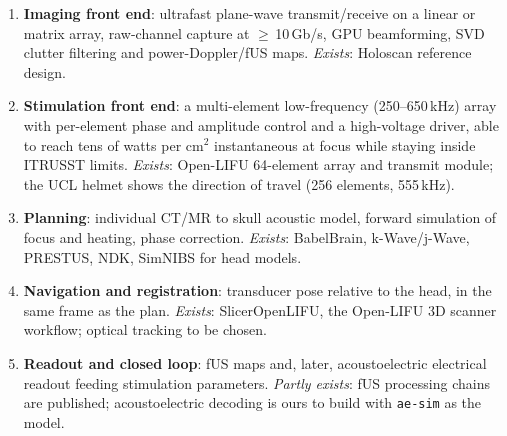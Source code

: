 \documentclass[11pt,a4paper]{article}
\begin{document}
\begin{enumerate}[leftmargin=*]
\item \textbf{Imaging front end}: ultrafast plane-wave transmit/receive on a linear or matrix array, raw-channel capture at $\geq$\,10\,Gb/s, GPU beamforming, SVD clutter filtering and power-Doppler/fUS maps. \emph{Exists}: Holoscan reference design.
\item \textbf{Stimulation front end}: a multi-element low-frequency (250--650\,kHz) array with per-element phase and amplitude control and a high-voltage driver, able to reach tens of watts per cm$^2$ instantaneous at focus while staying inside ITRUSST limits. \emph{Exists}: Open-LIFU 64-element array and transmit module; the UCL helmet shows the direction of travel (256 elements, 555\,kHz).
\item \textbf{Planning}: individual CT/MR to skull acoustic model, forward simulation of focus and heating, phase correction. \emph{Exists}: BabelBrain, k-Wave/j-Wave, PRESTUS, NDK, SimNIBS for head models.
\item \textbf{Navigation and registration}: transducer pose relative to the head, in the same frame as the plan. \emph{Exists}: SlicerOpenLIFU, the Open-LIFU 3D scanner workflow; optical tracking to be chosen.
\item \textbf{Readout and closed loop}: fUS maps and, later, acoustoelectric electrical readout feeding stimulation parameters. \emph{Partly exists}: fUS processing chains are published; acoustoelectric decoding is ours to build with \texttt{ae-sim} as the model.
\end{enumerate}
\end{document}
